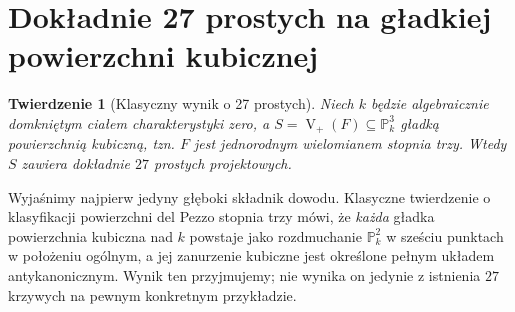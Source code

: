 \documentclass[11pt,a4paper,openany]{report}
\numberwithin{equation}{section}
\theoremstyle{plain}
\newtheorem{twierdzenie}{Twierdzenie}[section]
\theoremstyle{definition}
\theoremstyle{remark}
\newcommand{\PP}{\mathbb P}
\newcommand{\V}{\operatorname V}
\begin{document}
\section{Dokładnie 27 prostych na gładkiej powierzchni kubicznej}
\label{sec:ga6-27}

\begin{twierdzenie}[Klasyczny wynik o 27 prostych]
\label{tw:ga6-27-lines}
Niech $k$ będzie algebraicznie domkniętym ciałem
charakterystyki zero, a
$S=\V_+(F)\subseteq\PP^3_k$ gładką powierzchnią
kubiczną, tzn. $F$ jest jednorodnym wielomianem
stopnia trzy. Wtedy $S$ zawiera dokładnie
$27$ prostych projektowych.
\end{twierdzenie}

Wyjaśnimy najpierw jedyny głęboki składnik dowodu.
Klasyczne twierdzenie o klasyfikacji powierzchni
del Pezzo stopnia trzy mówi, że \emph{każda} gładka
powierzchnia kubiczna nad $k$ powstaje jako
rozdmuchanie $\PP^2_k$ w sześciu punktach w położeniu
ogólnym, a jej zanurzenie kubiczne jest określone
pełnym układem antykanonicznym. Wynik ten przyjmujemy;
nie wynika on jedynie z istnienia $27$ krzywych
na pewnym konkretnym przykładzie.
\end{document}
